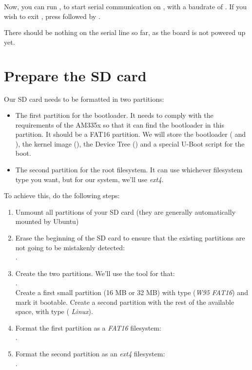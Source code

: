 Now, you can run , to start
serial communication on , with a baudrate of
. If you wish to exit , press
\code{[Ctrl][a]} followed by \code{[Ctrl][x]}.

There should be nothing on the serial line so far, as the board is not
powered up yet.

\section{Prepare the SD card}

Our SD card needs to be formatted in two partitions:

\begin{itemize}

\item The first partition for the bootloader. It needs to comply with
  the requirements of the AM335x so that it can find the bootloader in
  this partition. It should be a FAT16 partition. We will store the
  bootloader ( and ), the kernel image
  (), the Device Tree () and a
  special U-Boot script for the boot.

\item The second partition for the root filesystem. It can use
  whichever filesystem type you want, but for our system, we'll use
  {\em ext4}.

\end{itemize}

To achieve this, do the following steps:

\begin{enumerate}

\item Unmount all partitions of your SD card (they are generally
  automatically mounted by Ubuntu)

\item Erase the beginning of the SD card to ensure that the existing
  partitions are not going to be mistakenly detected:\\
  .

\item Create the two partitions. We'll use the  tool for
  that:\\
  .\\
  Create a first small partition (16 MB or 32 MB) with type 
  ({\em W95 FAT16}) and mark it bootable. Create a second partition
  with the rest of the available space, with type  ({\em
    Linux}).

\item Format the first partition as a {\em FAT16} filesystem:\\
  .

\item Format the second partition as an {\em ext4} filesystem:\\
  .

\end{enumerate}

